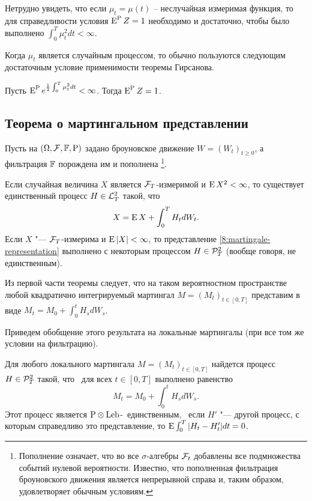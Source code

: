 Нетрудно увидеть, что если $\mu_t = \mu(t)$ -- неслучайная измеримая функция, то для справедливости условия $\E^{\P} Z = 1$ необходимо и достаточно, чтобы было выполнено $\int_0^T \mu_t^2 dt < \infty$.

Когда $\mu_t$ является случайным процессом, то обычно пользуются следующим достаточным условие применимости теоремы Гирсанова.

\begin{proposition}
Пусть $\E^{\P} e^{\frac12 \int_0^T \mu_t^2 dt} < \infty$.
Тогда $\E^{\P} Z = 1$.
\end{proposition}


\subsection{Теорема о мартингальном представлении}

Пусть на $(\Omega, \F, \FF, \P)$ задано броуновское движение $W=(W_t)_{t\ge0}$, а фильтрация $\FF$ порождена им и пополнена%
\footnote{\label{8:f:brownian-filtration} Пополнение означает, что во все $\sigma$-алгебры $\F_t$ добавлены все подмножества событий нулевой вероятности. 
Известно, что пополненная фильтрация броуновского движения является непрерывной справа и, таким образом, удовлетворяет обычным условиям.}.

\begin{theorem}
Если случайная величина $X$ является $\F_T$-измеримой и $\E X^2 < \infty$, то существует единственный процесс $H\in \L^2_T$ такой, что
\begin{equation}
\label{8:martingale-representation}
X = \E X + \int_0^T H_t d W_t.
\end{equation}
Если $X$ "--- $\F_T$-измерима и $\E|X| < \infty$, то представление \eqref{8:martingale-representation} выполнено с некоторым процессом $H\in \PP^2_T$ (вообще говоря, не единственным).
\end{theorem}

Из первой части теоремы следует, что на таком вероятностном пространстве любой квадратично интегрируемый мартингал $M=(M_t)_{t\in[0,T]}$ представим в виде $M_t = M_0 + \int_0^t H_s d W_s$.

Приведем обобщение этого результата на локальные мартингалы (при все том же условии на фильтрацию).

\begin{theorem}
Для любого локального мартингала $M = (M_t)_{t\in[0,T]}$ найдется процесс $H\in \PP^2_T$ такой, что \as\ для всех $t\in[0,T]$ выполнено равенство
\[
M_t = M_0 + \int_0^t H_s d W_s.
\]
Этот процесс является $\P\otimes\mathrm{Leb}$-\as\ единственным, \te\ если $H'$ "--- другой процесс, с которым справедливо это представление, то $\E\int_0^T |H_t-H_t'| dt = 0$.
\end{theorem}

